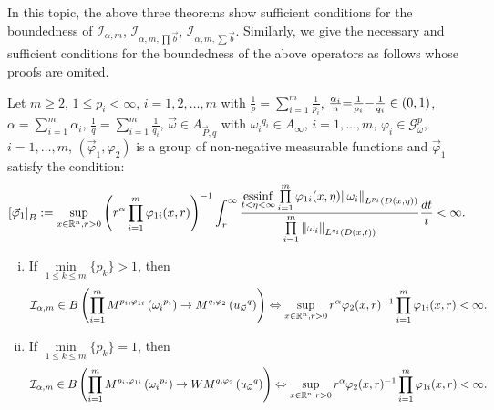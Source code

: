 \documentclass[11pt, twoside, leqno]{article}
\begin{document}
In this topic, the above three theorems show sufficient conditions for the boundedness of $\mathcal{I}_{\alpha,m}$, ${\mathcal{I}_{\alpha, m,\prod \vec b }}$, ${{\mathcal I}_{\alpha ,m,\sum {\vec b} }}$. Similarly, we give the necessary and sufficient conditions for the boundedness of the above operators as follows whose proofs are omited.
\begin{thm}\label{thm10}
	Let $m\geq 2$, $1\leq p_i<\infty$, $i=1,2,\ldots,m$ with $\frac{1}{p} = \sum\limits_{i = 1}^m {\frac{1}{{{p_i}}}}$, $\frac{{{\alpha _i}}}{n}{\rm{ = }}\frac{1}{{{p_i}}}{\rm{ - }}\frac{1}{{{q_i}}} \in (0,1)$, $\alpha  = \sum\limits_{i = 1}^m {{\alpha _i}}$, $\frac{1}{q} = \sum\limits_{i = 1}^m {\frac{1}{{{q_i}}}}$, $\vec{\omega} \in {A_{\vec P,q}}$ with ${\omega _i}^{{q_i}} \in {A_\infty }$, $i = 1, \ldots ,m$, ${\varphi _i} \in \mathcal{G}_\omega ^p$, $i = 1, \ldots ,m$, $({{\vec \varphi }_1},{\varphi _2})$ is a group of non-negative measurable functions and ${{\vec \varphi }_1}$ satisfy the condition:
	\begin{equation}
	{\left[ {{{\vec \varphi }_1}} \right]_B}: = \mathop {\sup }\limits_{x \in {{\mathbb R^n}},r > 0} {\left( {{r^\alpha }\prod\limits_{i = 1}^m {{\varphi _{1i}}(x,r)} } \right)^{{\rm{ - }}1}}\int_r^\infty  {\frac{{\mathop {{\rm{essinf}}}\limits_{t < \eta  < \infty } \prod\limits_{i = 1}^m {{\varphi _{1i}}(x,\eta ){{\left\| {{\omega _i}} \right\|}_{{L^{{p_i}}}(D(x,\eta ))}}} }}{{\prod\limits_{i = 1}^m {{{\left\| {{\omega _i}} \right\|}_{{L^{{q_i}}}(D(x,t))}}} }}\frac{{dt}}{t}}  < \infty.
	\end{equation}
	\begin{enumerate}[(i)]
		\item If $\mathop {\min }\limits_{1 \le k \le m} \{ {p_k}\}  > 1$, then
		\begin{equation*}
		{{\mathcal{I}}_{\alpha,m} } \in B\left( {\prod\limits_{i = 1}^m {{M^{{p_i},{\varphi _{1i}}}}\left( {{\omega _i}^{{p_i}}} \right)}  \to {M^{q,{\varphi _2}}}\left( {{u_{\vec \omega }}^q} \right)} \right) \Leftrightarrow \mathop {\sup }\limits_{x \in {{\mathbb R^n}},r > 0} {r^\alpha }{\varphi _2}{(x,r)^{ - 1}}\prod\limits_{i = 1}^m {{\varphi _{1i}}(x,r)}  < \infty.
		\end{equation*}
		\item If $\mathop {\min }\limits_{1 \le k \le m} \{ {p_k}\}  = 1$, then 		\begin{equation*}
		{{\mathcal I}_{\alpha,m} } \in B\left( {\prod\limits_{i = 1}^m {{M^{{p_i},{\varphi _{1i}}}}\left( {{\omega _i}^{{p_i}}} \right)}  \to {WM^{q,{\varphi _2}}}\left( {{u_{\vec \omega }}^q} \right)} \right) \Leftrightarrow \mathop {\sup }\limits_{x \in {{\mathbb R^n}},r > 0} {r^\alpha }{\varphi _2}{(x,r)^{ - 1}}\prod\limits_{i = 1}^m {{\varphi _{1i}}(x,r)}  < \infty.
		\end{equation*}
	\end{enumerate}
\end{thm}
\end{document}

